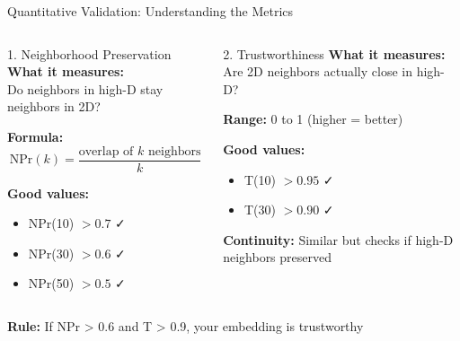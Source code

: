 \documentclass[aspectratio=169]{beamer}
\begin{document}
\begin{frame}{Quantitative Validation: Understanding the Metrics}
\begin{columns}
\begin{block}{1. Neighborhood Preservation}
\textbf{What it measures:}\\
Do neighbors in high-D stay neighbors in 2D?

\textbf{Formula:}
$$\text{NPr}(k) = \frac{\text{overlap of } k \text{ neighbors}}{k}$$

\textbf{Good values:}
\begin{itemize}
\item NPr(10) $> 0.7$ ✓
\item NPr(30) $> 0.6$ ✓
\item NPr(50) $> 0.5$ ✓
\end{itemize}
\end{block}

\begin{block}{2. Trustworthiness}
\textbf{What it measures:}\\
Are 2D neighbors actually close in high-D?

\textbf{Range:} 0 to 1 (higher = better)

\textbf{Good values:}
\begin{itemize}
\item T(10) $> 0.95$ ✓
\item T(30) $> 0.90$ ✓
\end{itemize}

\vspace{3mm}
\textbf{Continuity:} Similar but checks if high-D neighbors preserved
\end{block}
\end{columns}

\vspace{3mm}
\begin{center}
\colorbox{yellow!20}{\parbox{0.85\textwidth}{\centering
\textbf{Rule:} If NPr > 0.6 and T > 0.9, your embedding is trustworthy}}
\end{center}
\end{frame}
\end{document}
